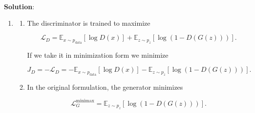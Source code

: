 \documentclass[submit]{harvardml}
\newenvironment{solution}{%
    \vspace{2mm}\color{blue}\noindent\textbf{Solution}:\ }
{}
\begin{document}
\begin{solution}
\begin{enumerate}
\begin{enumerate}
Thus

\[
V(D^*,G)
=
\mathrm{KL}(p_{\mathrm{data}} \,\|\, m)
+
\mathrm{KL}(p_g \,\|\, m)
-2\log 2.
\]

Using

\[
\mathrm{JS}(p_{\mathrm{data}} \,\|\, p_g)
=
\frac{1}{2}\mathrm{KL}(p_{\mathrm{data}} \,\|\, m)
+
\frac{1}{2}\mathrm{KL}(p_g \,\|\, m),
\]

we get

\[
\boxed{
V(D^*,G)
=
- \log 4
+
2\,\mathrm{JS}(p_{\mathrm{data}} \,\|\, p_g)
}.
\]
            \item This means that once the discriminator is optimal, training the generator is equivalent to minimizing

\[
\mathrm{JS}(p_{\mathrm{data}} \,\|\, p_g).
\]

So the generator is trying to make the model distribution \(p_g\) match the true data distribution \(p_{\mathrm{data}}\). The best case is when

\[
p_g = p_{\mathrm{data}},
\]

because then

\[
\mathrm{JS}(p_{\mathrm{data}} \,\|\, p_g)=0
\]

and

\[
V(D^*,G) = -\log 4.
\]

The generator is trying to produce samples so realistic that the discriminator cannot differentiate what is real from what is fake, in both cases 

\[
D^*(x)=\frac{1}{2}
\]

everywhere.
	    \end{enumerate}
        \item \begin{enumerate}
            \item The discriminator is trained to maximize

\[
\mathcal{L}_D
=
\mathbb{E}_{x \sim p_{\mathrm{data}}}[\log D(x)]
+
\mathbb{E}_{z \sim p_z}[\log(1-D(G(z)))].
\]

If we take it in minimization form we minimize

\[
J_D
=
-\mathcal{L}_D
=
-\mathbb{E}_{x \sim p_{\mathrm{data}}}[\log D(x)]
-
\mathbb{E}_{z \sim p_z}[\log(1-D(G(z)))].
\]

            \item In the original  formulation, the generator minimizes

\[
\mathcal{L}_G^{\mathrm{minimax}}
=
\mathbb{E}_{z \sim p_z}[\log(1-D(G(z)))].
\]


\end{enumerate}
\end{enumerate}
\end{solution}
\end{document}
